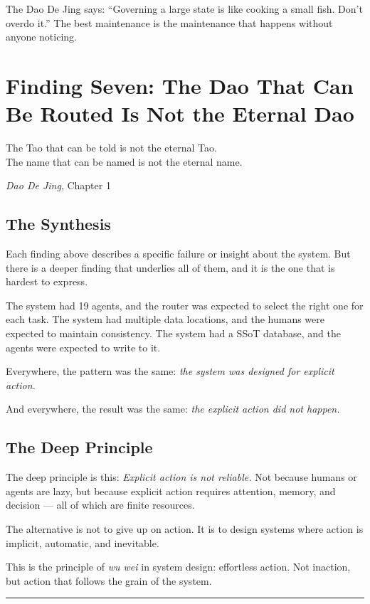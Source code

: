 \documentclass[12pt,a4paper,oneside]{book}
\begin{document}
The Dao De Jing says: \enquote{Governing a large state is like cooking a small fish. Don't overdo it.} The best maintenance is the maintenance that happens without anyone noticing.

\chapter{Finding Seven: The Dao That Can Be Routed Is Not the Eternal Dao}

\epigraph{The Tao that can be told is not the eternal Tao.\\The name that can be named is not the eternal name.}{\textit{Dao De Jing}, Chapter 1}

\section{The Synthesis}

Each finding above describes a specific failure or insight about the system. But there is a deeper finding that underlies all of them, and it is the one that is hardest to express.

The system had 19 agents, and the router was expected to select the right one for each task. The system had multiple data locations, and the humans were expected to maintain consistency. The system had a SSoT database, and the agents were expected to write to it.

Everywhere, the pattern was the same: \emph{the system was designed for explicit action.}

And everywhere, the result was the same: \emph{the explicit action did not happen.}

\section{The Deep Principle}

The deep principle is this: \emph{Explicit action is not reliable.} Not because humans or agents are lazy, but because explicit action requires attention, memory, and decision --- all of which are finite resources.

The alternative is not to give up on action. It is to design systems where action is implicit, automatic, and inevitable.

This is the principle of \emph{wu wei} in system design: effortless action. Not inaction, but action that follows the grain of the system.

\begin{center}
\rule{0.5\textwidth}{0.5pt}
\end{center}
\end{document}
